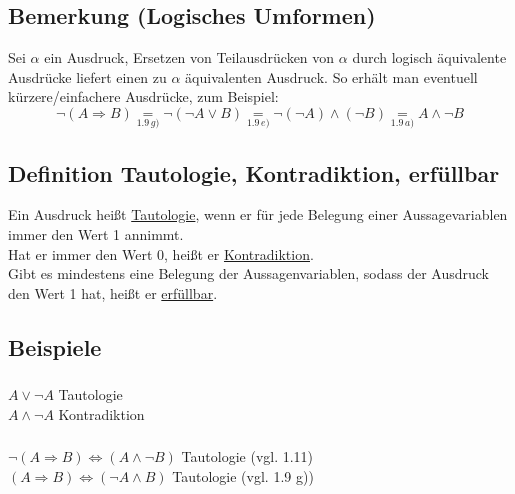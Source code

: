\documentclass[10pt,a4paper,titlepage,fleqn]{article}
\begin{document}
\subsection{Bemerkung (Logisches Umformen)}
	Sei $\alpha$ ein Ausdruck, Ersetzen von Teilausdrücken von $\alpha$ durch logisch
 	äquivalente Ausdrücke liefert einen zu $\alpha$ äquivalenten Ausdruck. So erhält man
 	eventuell kürzere/einfachere Ausdrücke, zum Beispiel:
	\[\neg (A\Rightarrow B) \underset{1.9\,g)}{=}\neg(\neg A\vee B) \underset{1.9\, e)}{=}\neg(\neg A) \wedge (\neg B) \underset{1.9\, a)}{=}A\wedge \neg B\]
\subsection{Definition Tautologie, Kontradiktion, erfüllbar}
	Ein Ausdruck heißt \underline{Tautologie}, wenn er für jede Belegung einer Aussagevariablen immer den
	Wert 1 annimmt.\\
	Hat er immer den Wert 0, heißt er \underline{Kontradiktion}.\\
	Gibt es mindestens eine Belegung der Aussagenvariablen, sodass der Ausdruck den Wert 1 hat, heißt
	er \underline{erfüllbar}.
\subsection{Beispiele}
\subsubsection{} $A\vee \neg A$ Tautologie\\
	\hphantom{a)  } $A\wedge \neg A$ Kontradiktion
\subsubsection{} $\neg (A \Rightarrow B) \Leftrightarrow (A\wedge \neg B)$ Tautologie (vgl. 1.11)\\
	\hphantom{b)  } $(A \Rightarrow B) \Leftrightarrow (\neg A\wedge B)$ Tautologie (vgl. 1.9 g))
\end{document}
